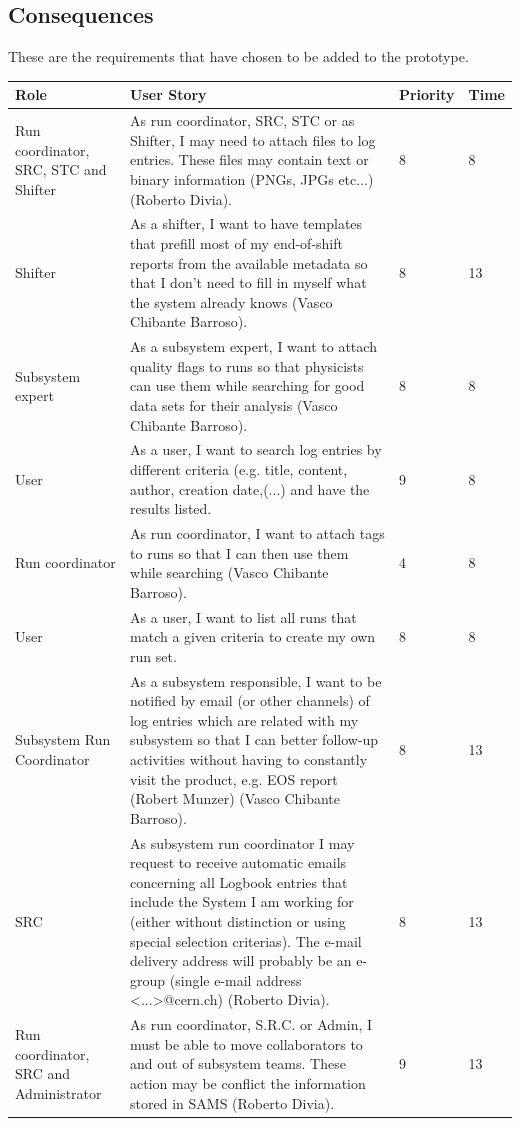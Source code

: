 \documentclass[paper=a4, fontsize=11pt,twoside]{scrartcl}	%
\begin{document}
\subsection{Consequences}
These are the requirements that have chosen to be added to the prototype. \\
\begin{longtable}{ | p{3cm} | p{8cm} | p{1cm} | l |}
\hline
Role & User Story & Priority & Time \\ \hline
Run coordinator, SRC, STC and Shifter& As run coordinator, SRC, STC or as Shifter, I may need to attach files to log entries. These files may contain text or binary information (PNGs, JPGs etc...) (Roberto Divia). & 8 & 8 \\ \hline
Shifter &  As a shifter, I want to have templates that prefill most of my end-of-shift reports from the available metadata so that I don’t need to fill in myself what the system already knows (Vasco Chibante Barroso). & 8 & 13 \\ \hline
Subsystem expert & As a subsystem expert, I want to attach quality flags to runs so that
physicists can use them while searching for good data sets for their analysis (Vasco Chibante Barroso). & 8 & 8 \\ \hline
User & As a user, I want to search log entries by different criteria (e.g. title, content, author, creation date,(...) and have the results listed. & 9 & 8 \\ \hline
Run coordinator &  As run coordinator, I want to attach tags to runs so that I can then use them while searching (Vasco Chibante Barroso). & 4 & 8 \\ \hline
User &  As a user, I want to list all runs that match a given criteria to create my own run set. & 8 & 8 \\ \hline
Subsystem Run Coordinator &  As a subsystem responsible, I want to be notified by email (or other channels) of log entries which are related with my subsystem so that I can better follow-up activities without having to constantly visit the product, e.g. EOS report (Robert Munzer) (Vasco Chibante Barroso). & 8 & 13 \\ \hline
SRC & As subsystem run coordinator I may request to receive automatic emails concerning all Logbook entries that include the System I am working for (either without distinction or using special selection criterias). The e-mail delivery address will probably be an e-group (single e-mail address <...>@cern.ch) (Roberto Divia). & 8 & 13 \\ \hline
Run coordinator, SRC and Administrator &  As run coordinator, S.R.C. or Admin, I must be able to move collaborators to and out of subsystem teams. These action may be conflict the information stored in SAMS (Roberto Divia). & 9 & 13 \\ \hline
\end{longtable}
\end{document}

